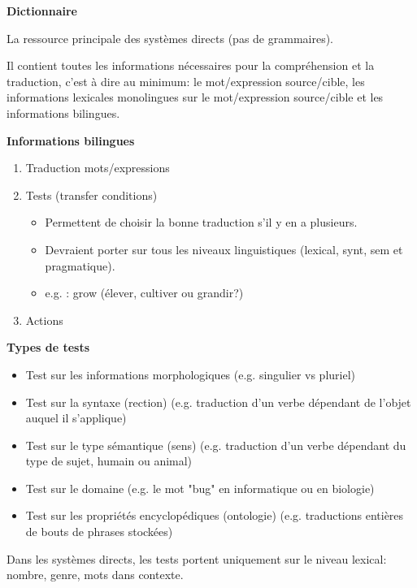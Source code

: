 \textbf{Dictionnaire}

La ressource principale des systèmes directs (pas de grammaires).

Il contient toutes les informations nécessaires pour la compréhension et la traduction,
c'est à dire au minimum: le mot/expression source/cible, les informations lexicales monolingues sur le mot/expression source/cible et les informations bilingues.\\

\newpage

\textbf{Informations bilingues}

\begin{enumerate}
    \item Traduction mots/expressions
    \item Tests (transfer conditions)
    \begin{itemize}
        \item Permettent de choisir la bonne traduction s'il y en a plusieurs.
        \item Devraient porter sur tous les niveaux linguistiques (lexical, synt, sem et pragmatique).
        \item e.g. : grow (élever, cultiver ou grandir?)
    \end{itemize}
    \item Actions
\end{enumerate}

\textbf{Types de tests}

\begin{itemize}
    \item Test sur les informations morphologiques (e.g. singulier vs pluriel)
    \item Test sur la syntaxe (rection) (e.g. traduction d'un verbe dépendant de
    l'objet auquel il s'applique)
    \item Test sur le type sémantique (sens) (e.g. traduction d'un verbe dépendant
    du type de sujet, humain ou animal)
    \item Test sur le domaine (e.g. le mot "bug" en informatique ou en biologie)
    \item Test sur les propriétés encyclopédiques (ontologie) (e.g. traductions
    entières de bouts de phrases stockées)\\
\end{itemize}

Dans les systèmes directs, les tests portent uniquement sur le niveau lexical:
nombre, genre, mots dans contexte.

